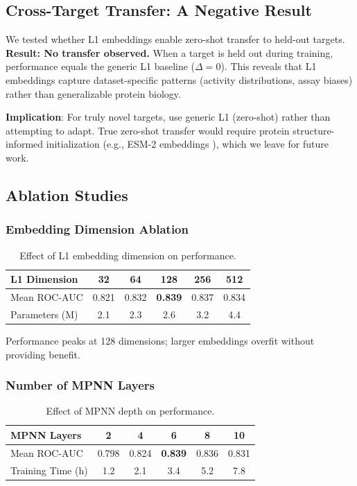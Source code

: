 \documentclass[runningheads]{llncs}
\begin{document}
\subsection{Cross-Target Transfer: A Negative Result}

We tested whether L1 embeddings enable zero-shot transfer to held-out targets. \textbf{Result: No transfer observed.} When a target is held out during training, performance equals the generic L1 baseline ($\Delta = 0$). This reveals that L1 embeddings capture dataset-specific patterns (activity distributions, assay biases) rather than generalizable protein biology.

\textbf{Implication}: For truly novel targets, use generic L1 (zero-shot) rather than attempting to adapt. True zero-shot transfer would require protein structure-informed initialization (e.g., ESM-2 embeddings \cite{lin_2023_esm2}), which we leave for future work.

\subsection{Ablation Studies}

\subsubsection{Embedding Dimension Ablation}

\begin{table}[t]
\caption{Effect of L1 embedding dimension on performance.}
\label{tab:dim_ablation}
\centering
\small
\begin{tabular}{@{}lccccc@{}}
\toprule
L1 Dimension & 32 & 64 & 128 & 256 & 512 \\
\midrule
Mean ROC-AUC & 0.821 & 0.832 & \textbf{0.839} & 0.837 & 0.834 \\
Parameters (M) & 2.1 & 2.3 & 2.6 & 3.2 & 4.4 \\
\bottomrule
\end{tabular}
\end{table}

Performance peaks at 128 dimensions; larger embeddings overfit without providing benefit.

\subsubsection{Number of MPNN Layers}

\begin{table}[t]
\caption{Effect of MPNN depth on performance.}
\label{tab:depth_ablation}
\centering
\small
\begin{tabular}{@{}lccccc@{}}
\toprule
MPNN Layers & 2 & 4 & 6 & 8 & 10 \\
\midrule
Mean ROC-AUC & 0.798 & 0.824 & \textbf{0.839} & 0.836 & 0.831 \\
Training Time (h) & 1.2 & 2.1 & 3.4 & 5.2 & 7.8 \\
\bottomrule
\end{tabular}
\end{table}
\end{document}
